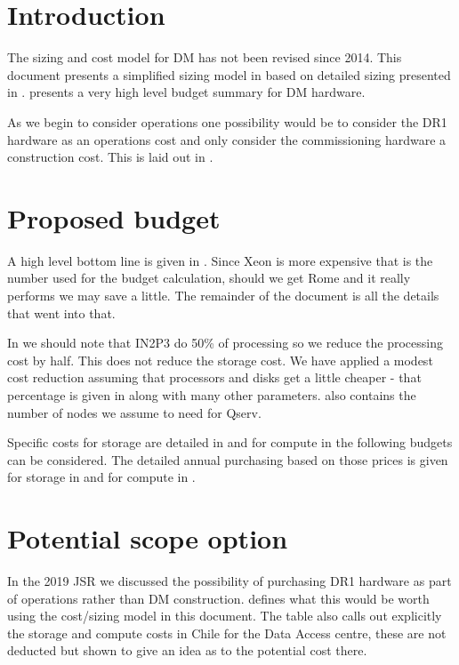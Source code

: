 \section{Introduction}
The sizing and cost model for DM has not been revised since 2014. This document presents
a simplified sizing model in  based on detailed sizing presented in .
 presents a very high level budget summary for
DM hardware.

As we begin to consider operations one possibility would be to consider the DR1 hardware
as an operations cost and only consider the commissioning hardware a construction cost.
This is laid out in .

\section{Proposed budget}\label{sec:cost}

A high level bottom line is given in .
Since Xeon is more expensive that is the number used for the budget calculation, should we get Rome and it really performs we may save a little.
The remainder of the document is all the details that went into that.



In  we should note that IN2P3 do 50\% of processing so we reduce the processing cost by half. This does not
reduce the storage cost. We have applied a modest cost reduction assuming that processors  and disks get a little cheaper - that
percentage is given in  along with many other parameters.  also contains the number of nodes we assume to need for Qserv.

Specific  costs for storage are detailed in  and for compute in 
the following budgets can be considered. The detailed annual purchasing based on those prices is given for
storage in  and for compute in .

\section{Potential scope option} \label{sec:scope}
In the 2019 JSR we discussed the possibility of purchasing DR1 hardware as part of operations
rather than DM construction.
 defines what this would be worth using the cost/sizing model in this document.
The table also calls out explicitly the storage  and compute costs in Chile for the Data Access centre,
these are not deducted but shown to give an idea as to the potential cost there.

